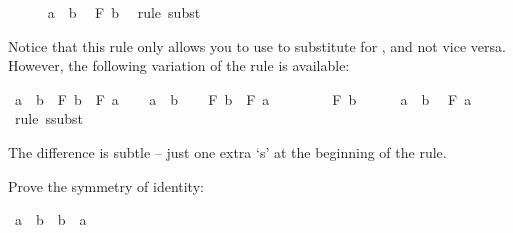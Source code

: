 \begin{isabellebody}
\ \ \ \ \isamarkupfalse%
\ {\isacharbackquoteopen}a\ {\isacharequal}\ b{\isacharbackquoteclose}\ \isamarkupfalse%
\ {\isachardoublequoteopen}F\ b{\isachardoublequoteclose}\ \isamarkupfalse%
\ {\isacharparenleft}rule\ subst{\isacharparenright}\isanewline
\ \ \isamarkupfalse%
\isanewline
{}\isamarkupfalse%
%
\endisatagproof
{\isafoldproof}%
%
\isadelimproof
%
\endisadelimproof
%
\begin{isamarkuptext}%
Notice that this rule only allows you to use  to substitute  for
, and not vice versa. However, the following variation of the rule is available:%
\end{isamarkuptext}\isamarkuptrue%
\isamarkupfalse%
\ {\isachardoublequoteopen}a\ {\isacharequal}\ b\ {\isasymlongrightarrow}\ F\ b\ {\isasymlongrightarrow}\ F\ a{\isachardoublequoteclose}\isanewline
%
\isadelimproof
%
\endisadelimproof
%
\isatagproof
{}\isamarkupfalse%
\isanewline
\ \ \isamarkupfalse%
\ {\isachardoublequoteopen}a\ {\isacharequal}\ b{\isachardoublequoteclose}\isanewline
\ \ \isamarkupfalse%
\ {\isachardoublequoteopen}F\ b\ {\isasymlongrightarrow}\ F\ a{\isachardoublequoteclose}\isanewline
\ \ \isamarkupfalse%
\isanewline
\ \ \ \ \isamarkupfalse%
\ {\isachardoublequoteopen}F\ b{\isachardoublequoteclose}\isanewline
\ \ \ \ \isamarkupfalse%
\ {\isacharbackquoteopen}a\ {\isacharequal}\ b{\isacharbackquoteclose}\ \isamarkupfalse%
\ {\isachardoublequoteopen}F\ a{\isachardoublequoteclose}\ \isamarkupfalse%
\ {\isacharparenleft}rule\ ssubst{\isacharparenright}\isanewline
\ \ \isamarkupfalse%
\isanewline
{}\isamarkupfalse%
%
\endisatagproof
{\isafoldproof}%
%
\isadelimproof
%
\endisadelimproof
%
\begin{isamarkuptext}%
The difference is subtle -- just one extra `s' at the beginning of the rule.%
\end{isamarkuptext}\isamarkuptrue%
%
\begin{isamarkuptext}%
\begin{Exercise}[label = symmetry] Prove the symmetry of identity: \end{Exercise}%
\end{isamarkuptext}\isamarkuptrue%
\isamarkupfalse%
\ {\isachardoublequoteopen}a\ {\isacharequal}\ b\ {\isasymlongrightarrow}\ b\ {\isacharequal}\ a{\isachardoublequoteclose}%

\end{isabellebody}
